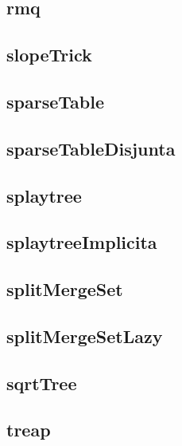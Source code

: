 \subsection{rmq}
\raggedbottom
\hrulefill
\subsection{slopeTrick}
\raggedbottom
\hrulefill
\subsection{sparseTable}
\raggedbottom
\hrulefill
\subsection{sparseTableDisjunta}
\raggedbottom
\hrulefill
\subsection{splaytree}
\raggedbottom
\hrulefill
\subsection{splaytreeImplicita}
\raggedbottom
\hrulefill
\subsection{splitMergeSet}
\raggedbottom
\hrulefill
\subsection{splitMergeSetLazy}
\raggedbottom
\hrulefill
\subsection{sqrtTree}
\raggedbottom
\hrulefill
\subsection{treap}
\raggedbottom
\hrulefill
